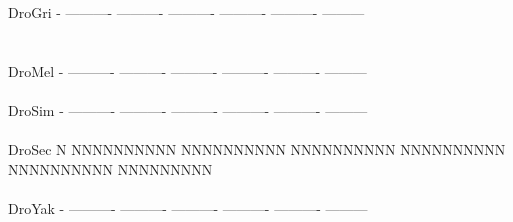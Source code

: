 \documentclass[11pt,twoside,reqno,a4paper]{article}
\begin{document}
{DroGri	-	----------	----------	----------	----------	----------	---------\\
\hspace*{7\charwidth}\hspace*{1\charwidth}\hspace*{1\charwidth}\hspace*{1\charwidth}\hspace*{1\charwidth}\hspace*{1\charwidth}\hspace*{1\charwidth}\\
\\
DroMel	-	----------	----------	----------	----------	----------	---------\\
\hspace*{7\charwidth}\hspace*{1\charwidth}\hspace*{1\charwidth}\hspace*{1\charwidth}\hspace*{1\charwidth}\hspace*{1\charwidth}\hspace*{1\charwidth}\\
DroSim	-	----------	----------	----------	----------	----------	---------\\
\hspace*{7\charwidth}\hspace*{1\charwidth}\hspace*{1\charwidth}\hspace*{1\charwidth}\hspace*{1\charwidth}\hspace*{1\charwidth}\hspace*{1\charwidth}\\
DroSec	N	NNNNNNNNNN	NNNNNNNNNN	NNNNNNNNNN	NNNNNNNNNN	NNNNNNNNNN	NNNNNNNNN\\
\hspace*{7\charwidth}\hspace*{1\charwidth}\hspace*{1\charwidth}\hspace*{1\charwidth}\hspace*{1\charwidth}\hspace*{1\charwidth}\hspace*{1\charwidth}\\
DroYak	-	----------	----------	----------	----------	----------	---------\\
\hspace*{7\charwidth}\hspace*{1\charwidth}\hspace*{1\charwidth}\hspace*{1\charwidth}\hspace*{1\charwidth}\hspace*{1\charwidth}\hspace*{1\charwidth}\\
}
\end{document}
